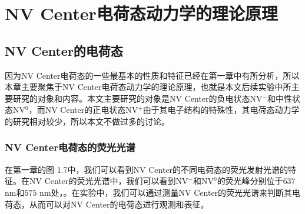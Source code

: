 \documentclass[type = bachelor]{whu-thesis}
\begin{document}

\chapter{NV Center电荷态动力学的理论原理}

\section{NV Center的电荷态}
因为NV Center电荷态的一些最基本的性质和特征已经在第一章中有所分析，所以本章主要聚焦于NV Center电荷态动力学的理论原理，也就是本文后续实验中所主要研究的对象和内容。本文主要研究的对象是NV Center的负电状态NV$^-$和中性状态NV$^0$，而NV Center的正电状态NV$^+$由于其电子结构的特殊性，其电荷态动力学的研究相对较少，所以本文不做过多的讨论\cite{schreyvogel2016active}。

\subsection{NV Center电荷态的荧光光谱}

在第一章的图 1.7中，我们可以看到NV Center的不同电荷态的荧光发射光谱的特征。在NV Center的荧光光谱中，我们可以看到NV$^-$和NV$^0$的荧光峰分别位于$637$ nm和$575$ nm处，。在实验中，我们可以通过测量NV Center的荧光光谱来判断其电荷态，从而可以对NV Center的电荷态进行观测和表征。
\end{document}
